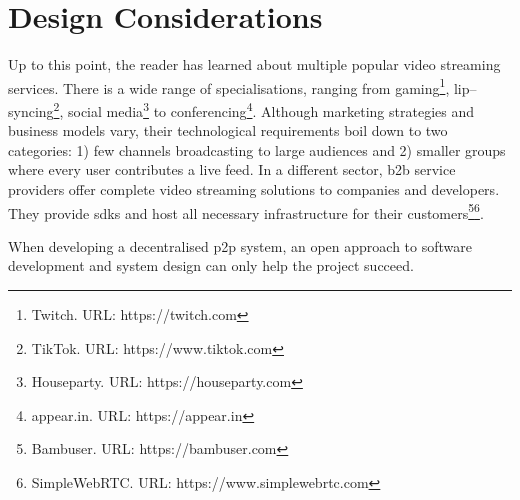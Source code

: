 \section{Design Considerations}

Up to this point, the reader has learned about multiple popular video streaming services. There is a wide range of specialisations, ranging from gaming\footnote{Twitch. URL: {https://twitch.com}}, lip–syncing\footnote{TikTok. URL: {https://www.tiktok.com}}, social media\footnote{Houseparty. URL: {https://houseparty.com}} to conferencing\footnote{appear.in. URL: {https://appear.in}}. Although marketing strategies and business models vary, their technological requirements boil down to two categories: 1) few channels broadcasting to large audiences and 2) smaller groups where every user contributes a live feed.
In a different sector, \gls{b2b} service providers offer complete video streaming solutions to companies and developers. They provide \glspl{sdk} and host all necessary infrastructure for their customers\footnote{Bambuser. URL: {https://bambuser.com}}\footnote{SimpleWebRTC. URL: {https://www.simplewebrtc.com}}.

When developing a decentralised \gls{p2p} system, an open approach to software development and system design can only help the project succeed.
